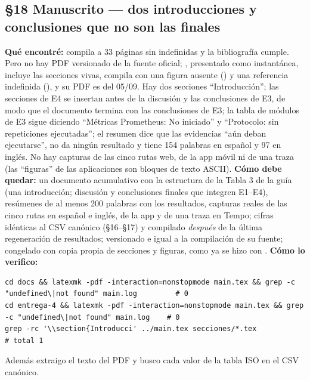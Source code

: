 \subsection*{\S18 Manuscrito --- dos introducciones y conclusiones que no son las finales}
\textbf{Qu\'e encontr\'e:} compila a 33 p\'aginas sin indefinidas y la bibliograf\'ia cumple. Pero no hay PDF versionado de la fuente oficial; , presentado como instant\'anea, incluye las secciones vivas, compila con una figura ausente () y una referencia indefinida (), y su PDF es del 05/09. Hay dos secciones ``Introducci\'on''; las secciones de E4 se insertan antes de la discusi\'on y las conclusiones de E3, de modo que el documento termina con las conclusiones de E3; la tabla de m\'odulos de E3 sigue diciendo ``M\'etricas Prometheus: No iniciado'' y ``Protocolo: sin repeticiones ejecutadas''; el resumen dice que las evidencias ``a\'un deban ejecutarse'', no da ning\'un resultado y tiene 154 palabras en espa\~nol y 97 en ingl\'es. No hay capturas de las cinco rutas web, de la app m\'ovil ni de una traza (las ``figuras'' de las aplicaciones son bloques de texto ASCII). \textbf{C\'omo debe quedar:} un documento acumulativo con la estructura de la Tabla 3 de la gu\'ia (una introducci\'on; discusi\'on y conclusiones finales que integren E1--E4), res\'umenes de al menos 200 palabras con los resultados, capturas reales de las cinco rutas en espa\~nol e ingl\'es, de la app y de una traza en Tempo; cifras id\'enticas al CSV can\'onico (\S16--\S17) y compilado \emph{despu\'es} de la \'ultima regeneraci\'on de resultados;  versionado e igual a la compilaci\'on de su fuente;  congelado con copia propia de secciones y figuras, como ya se hizo con . \textbf{C\'omo lo verifico:}\begin{verbatim}
cd docs && latexmk -pdf -interaction=nonstopmode main.tex && grep -c "undefined\|not found" main.log         # 0
cd entrega-4 && latexmk -pdf -interaction=nonstopmode main.tex && grep -c "undefined\|not found" main.log    # 0
grep -rc '\\section{Introducci' ../main.tex secciones/*.tex                                                 # total 1
\end{verbatim}
Adem\'as extraigo el texto del PDF y busco cada valor de la tabla ISO en el CSV can\'onico.

